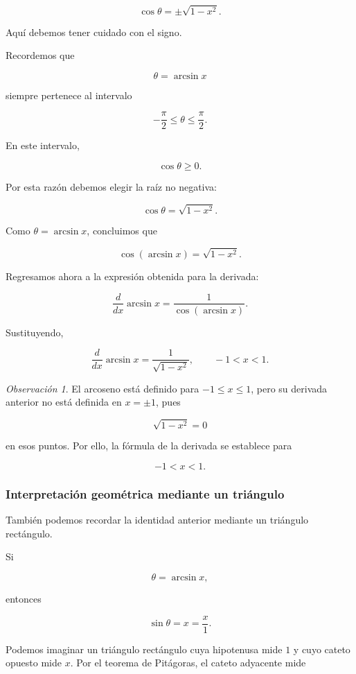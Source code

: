 \documentclass[12pt]{article}
\theoremstyle{definition}
\theoremstyle{remark}
\newtheorem*{observacion}{Observación}
\begin{document}
\[
\cos\theta
=
\pm\sqrt{1-x^2}.
\]

Aquí debemos tener cuidado con el signo.

Recordemos que

\[
\theta=\arcsin x
\]

siempre pertenece al intervalo

\[
-\frac{\pi}{2}
\leq
\theta
\leq
\frac{\pi}{2}.
\]

En este intervalo,

\[
\cos\theta\geq0.
\]

Por esta razón debemos elegir la raíz no negativa:

\[
\cos\theta
=
\sqrt{1-x^2}.
\]

Como $\theta=\arcsin x$, concluimos que

\[
\boxed{
\cos(\arcsin x)
=
\sqrt{1-x^2}.
}
\]

Regresamos ahora a la expresión obtenida para la derivada:

\[
\frac{d}{dx}\arcsin x
=
\frac{1}{\cos(\arcsin x)}.
\]

Sustituyendo,

\[
\boxed{
\frac{d}{dx}\arcsin x
=
\frac{1}{\sqrt{1-x^2}},
\qquad -1<x<1.
}
\]

\begin{observacion}
El arcoseno está definido para $-1\leq x\leq1$, pero su derivada
anterior no está definida en $x=\pm1$, pues

\[
\sqrt{1-x^2}=0
\]

en esos puntos. Por ello, la fórmula de la derivada se establece para

\[
-1<x<1.
\]
\end{observacion}

\subsubsection{Interpretación geométrica mediante un triángulo}

También podemos recordar la identidad anterior mediante un triángulo
rectángulo.

Si

\[
\theta=\arcsin x,
\]

entonces

\[
\sin\theta=x=\frac{x}{1}.
\]

Podemos imaginar un triángulo rectángulo cuya hipotenusa mide $1$ y
cuyo cateto opuesto mide $x$. Por el teorema de Pitágoras, el cateto
adyacente mide
\end{document}
